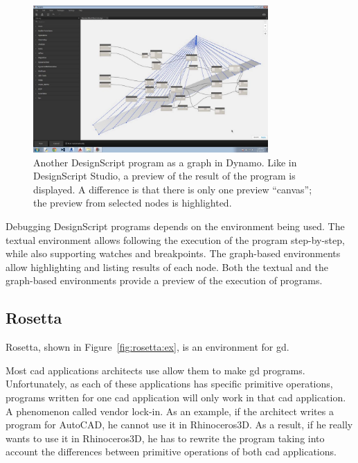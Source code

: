 \begin{figure}
	\centering
	\includegraphics[width=0.8\textwidth]{images/ds_dynamo}
	\caption[Another DesignScript program as a graph in Dynamo. Like in DesignScript Studio, a preview of the result of the program is displayed.]{Another DesignScript program as a graph in Dynamo. Like in DesignScript Studio, a preview of the result of the program is displayed. A difference is that there is only one preview ``canvas''; the preview from selected nodes is highlighted.}
	\label{fig:ds:dynamo}
\end{figure}

Debugging DesignScript programs depends on the environment being used.
The textual environment allows following the execution of the program step-by-step, while also supporting watches and breakpoints.
The graph-based environments allow highlighting and listing results of each node.
Both the textual and the graph-based environments provide a preview of the execution of programs.


\subsection{Rosetta}
\label{section:rosetta:related}
Rosetta\cite{de2012modern,lopes2011portable}, shown in Figure~\ref{fig:rosetta:ex}, is an environment for \gls{gd}.

Most \gls{cad} applications architects use allow them to make \gls{gd} programs.
Unfortunately, as each of these applications has specific primitive operations, programs written for one \gls{cad} application will only work in that \gls{cad} application.
A phenomenon called vendor lock-in.
As an example, if the architect writes a program for AutoCAD, he cannot use it in Rhinoceros3D.
As a result, if he really wants to use it in Rhinoceros3D, he has to rewrite the program taking into account the differences between primitive operations of both \gls{cad} applications.


